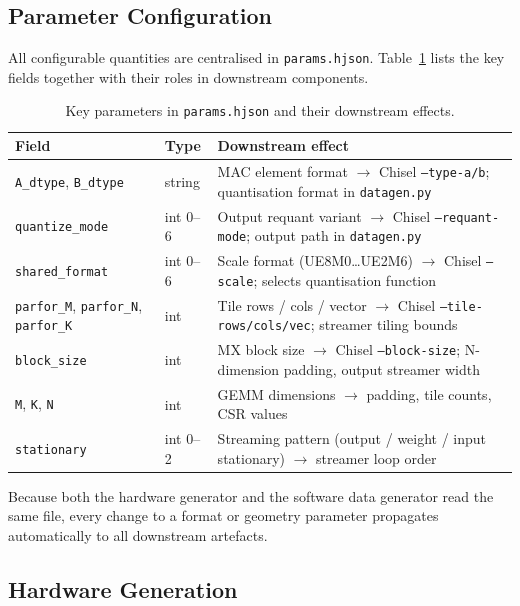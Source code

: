 \subsection{Parameter Configuration}
\label{sec:integration:params}

All configurable quantities are centralised in \texttt{params.hjson}.
Table~\ref{tab:params} lists the key fields together with their roles
in downstream components.

\begin{table}[h]
\centering
\caption{Key parameters in \texttt{params.hjson} and their downstream
         effects.}
\label{tab:params}
\begin{tabular}{lll}
\toprule
\textbf{Field} & \textbf{Type} & \textbf{Downstream effect} \\
\midrule
\texttt{A\_dtype}, \texttt{B\_dtype}
  & string & MAC element format $\to$ Chisel \texttt{--type-a/b};
             quantisation format in \texttt{datagen.py} \\
\texttt{quantize\_mode}
  & int 0--6 & Output requant variant $\to$ Chisel \texttt{--requant-mode};
               output path in \texttt{datagen.py} \\
\texttt{shared\_format}
  & int 0--6 & Scale format (UE8M0\dots UE2M6) $\to$ Chisel
               \texttt{--scale}; selects quantisation function \\
\texttt{parfor\_M}, \texttt{parfor\_N}, \texttt{parfor\_K}
  & int & Tile rows / cols / vector $\to$ Chisel \texttt{--tile-rows/cols/vec};
          streamer tiling bounds \\
\texttt{block\_size}
  & int & MX block size $\to$ Chisel \texttt{--block-size};
          N-dimension padding, output streamer width \\
\texttt{M}, \texttt{K}, \texttt{N}
  & int & GEMM dimensions $\to$ padding, tile counts, CSR values \\
\texttt{stationary}
  & int 0--2 & Streaming pattern (output / weight / input stationary)
               $\to$ streamer loop order \\
\bottomrule
\end{tabular}
\end{table}

Because both the hardware generator and the software data generator
read the same file, every change to a format or geometry parameter
propagates automatically to all downstream artefacts.

\subsection{Hardware Generation}
\label{sec:integration:hw}


